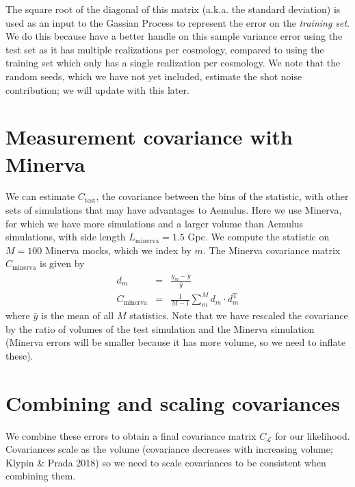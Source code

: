 \documentclass[12pt]{article}
\newcommand{\T}{^{\mathrm{T}}}
\newcommand{\like}{\mathcal{L}}
\newcommand{\cov}[1]{C_\text{#1}}
\newcommand{\covtot}{C_\like}
\begin{document}
The square root of the diagonal of this matrix (a.k.a. the standard deviation) is used as an input to the Gassian Process to represent the error on the \emph{training set}. %
We do this because have a better handle on this sample variance error using the test set as it has multiple realizations per cosmology, compared to using the training set which only has a single realization per cosmology.
We note that the random seeds, which we have not yet included, estimate the shot noise contribution; we will update with this later.


\section{Measurement covariance with Minerva}

We can estimate $\cov{test}$, the covariance between the bins of the statistic, with other sets of simulations that may have advantages to Aemulus.
Here we use Minerva, for which we have more simulations and a larger volume than Aemulus simulations, with side length $L_\text{minerva}=1.5$ Gpc.
We compute the statistic on $M=100$ Minerva mocks, which we index by $m$.
The Minerva covariance matrix $\cov{minerva}$ is given by
\begin{eqnarray}
d_m &=& \frac{y_{m} - \bar{y}}{\bar{y}} \\
\cov{minerva} &=& \frac{1}{M-1} \sum_m^M d_m \cdot d_m\T
\end{eqnarray}
where $\bar{y}$ is the mean of all $M$ statistics.
Note that we have rescaled the covariance by the ratio of volumes of the test simulation and the Minerva simulation (Minerva errors will be smaller because it has more volume, so we need to inflate these).


\section{Combining and scaling covariances}

We combine these errors to obtain a final covariance matrix $\covtot$ for our likelihood.
Covariances scale as the volume (covariance decreases with increasing volume; Klypin \& Prada 2018) so we need to scale covariances to be consistent when combining them.
\end{document}

